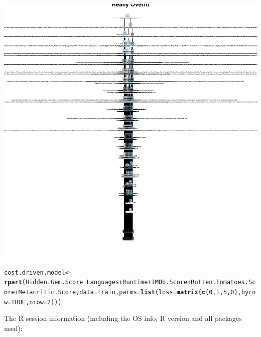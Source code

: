 \documentclass{article}\usepackage[]{graphicx}\usepackage[]{color}
\makeatletter
\newcommand{\hlnum}[1]{\textcolor[rgb]{0.686,0.059,0.569}{#1}}%
\newcommand{\hlopt}[1]{\textcolor[rgb]{0,0,0}{#1}}%
\newcommand{\hlstd}[1]{\textcolor[rgb]{0.345,0.345,0.345}{#1}}%
\newcommand{\hlkwb}[1]{\textcolor[rgb]{0.69,0.353,0.396}{#1}}%
\newcommand{\hlkwc}[1]{\textcolor[rgb]{0.333,0.667,0.333}{#1}}%
\newcommand{\hlkwd}[1]{\textcolor[rgb]{0.737,0.353,0.396}{\textbf{#1}}}%
\newenvironment{kframe}{%
 \def\at@end@of@kframe{}%
 \ifinner\ifhmode%
  \def\at@end@of@kframe{\end{minipage}}%
  \begin{minipage}{\columnwidth}%
 \fi\fi%
 \def\FrameCommand##1{\hskip\@totalleftmargin \hskip-\fboxsep
 \colorbox{shadecolor}{##1}\hskip-\fboxsep
     \hskip-\linewidth \hskip-\@totalleftmargin \hskip\columnwidth}%
 \MakeFramed {\advance\hsize-\width
   \@totalleftmargin\z@ \linewidth\hsize
   \@setminipage}}%
 {\par\unskip\endMakeFramed%
 \at@end@of@kframe}
\newenvironment{knitrout}{}{} %
\makeatother
\begin{document}
\begin{knitrout}
\begin{kframe}
{\ttfamily\noindent\color{warningcolor}{\#\# Warning: labs do not fit even at cex 0.15, there may be some overplotting}}\end{kframe}

{\centering \includegraphics[width=.6\linewidth]{figure/Task2-Rnwauto-report-3} 

}


\begin{kframe}\begin{alltt}
\hlstd{cost.driven.model} \hlkwb{<-} \hlkwd{rpart}\hlstd{(Hidden.Gem.Score}\hlopt{~}\hlstd{Languages}\hlopt{+}\hlstd{Runtime}\hlopt{+}\hlstd{IMDb.Score}\hlopt{+}\hlstd{Rotten.Tomatoes.Score}\hlopt{+}\hlstd{Metacritic.Score,}\hlkwc{data}\hlstd{=train,}\hlkwc{parms}\hlstd{=}\hlkwd{list}\hlstd{(}\hlkwc{loss}\hlstd{=}\hlkwd{matrix}\hlstd{(}\hlkwd{c}\hlstd{(}\hlnum{0}\hlstd{,}\hlnum{1}\hlstd{,}\hlnum{5}\hlstd{,}\hlnum{0}\hlstd{),}\hlkwc{byrow}\hlstd{=}\hlnum{TRUE}\hlstd{,}\hlkwc{nrow}\hlstd{=}\hlnum{2}\hlstd{)))}
\end{alltt}
\end{kframe}
\end{knitrout}

The R session information (including the OS info, R version and all
packages used):
\end{document}
